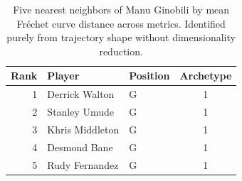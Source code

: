 \begin{table}[htbp]
  \centering\small
  \begin{tabular}{rllc}
    \toprule
    Rank & Player & Position & Archetype \\
    \midrule
    1 & Derrick Walton & G & 1 \\
    2 & Stanley Umude & G & 1 \\
    3 & Khris Middleton & G & 1 \\
    4 & Desmond Bane & G & 1 \\
    5 & Rudy Fernandez & G & 1 \\
    \bottomrule
  \end{tabular}
  \caption{Five nearest neighbors of Manu Ginobili by mean Fr\'{e}chet curve distance across metrics. Identified purely from trajectory shape without dimensionality reduction.}
  \label{tab:Manu_Ginobili_frechet_curve_neighbors}
\end{table}

